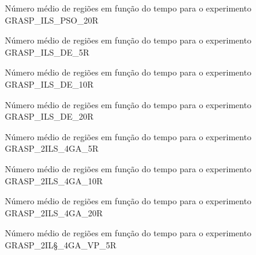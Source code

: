 \begin{apendicesenv}
\begin{figure}
    \centering
    \caption{Número médio de regiões em função do tempo para o experimento GRASP\_ILS\_PSO\_20R}
    
\end{figure}

\begin{figure}
    \centering
    \caption{Número médio de regiões em função do tempo para o experimento GRASP\_ILS\_DE\_5R}
    
\end{figure}

\begin{figure}
    \centering
    \caption{Número médio de regiões em função do tempo para o experimento GRASP\_ILS\_DE\_10R}
    
\end{figure}

\begin{figure}
    \centering
    \caption{Número médio de regiões em função do tempo para o experimento GRASP\_ILS\_DE\_20R}
    
\end{figure}

\begin{figure}
    \centering
    \caption{Número médio de regiões em função do tempo para o experimento GRASP\_2ILS\_4GA\_5R}
    
\end{figure}

\begin{figure}
    \centering
    \caption{Número médio de regiões em função do tempo para o experimento GRASP\_2ILS\_4GA\_10R}
    
\end{figure}

\begin{figure}
    \centering
    \caption{Número médio de regiões em função do tempo para o experimento GRASP\_2ILS\_4GA\_20R}
    
\end{figure}

\begin{figure}
    \centering
    \caption{Número médio de regiões em função do tempo para o experimento GRASP\_2IL\S_4GA\_VP\_5R}
    
\end{figure}


\end{apendicesenv}

